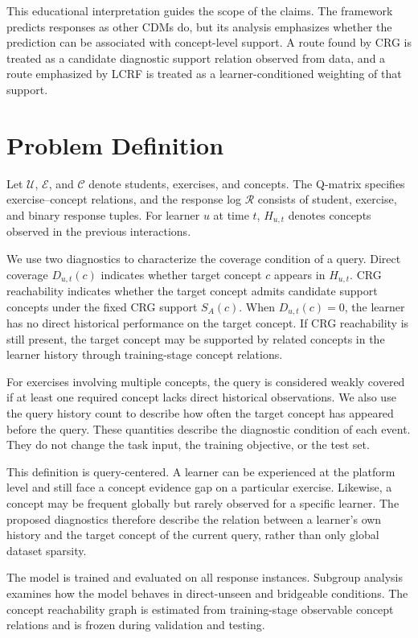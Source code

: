 \documentclass[conference]{IEEEtran}
\begin{document}
This educational interpretation guides the scope of the claims. The framework predicts responses as other CDMs do, but its analysis emphasizes whether the prediction can be associated with concept-level support. A route found by CRG is treated as a candidate diagnostic support relation observed from data, and a route emphasized by LCRF is treated as a learner-conditioned weighting of that support.

\section{Problem Definition}
Let \(\mathcal{U}\), \(\mathcal{E}\), and \(\mathcal{C}\) denote students, exercises, and concepts. The Q-matrix specifies exercise--concept relations, and the response log \(\mathcal{R}\) consists of student, exercise, and binary response tuples. For learner \(u\) at time \(t\), \(H_{u,t}\) denotes concepts observed in the previous interactions.

We use two diagnostics to characterize the coverage condition of a query. Direct coverage \(D_{u,t}(c)\) indicates whether target concept \(c\) appears in \(H_{u,t}\). CRG reachability indicates whether the target concept admits candidate support concepts under the fixed CRG support \(S_A(c)\). When \(D_{u,t}(c)=0\), the learner has no direct historical performance on the target concept. If CRG reachability is still present, the target concept may be supported by related concepts in the learner history through training-stage concept relations.

For exercises involving multiple concepts, the query is considered weakly covered if at least one required concept lacks direct historical observations. We also use the query history count to describe how often the target concept has appeared before the query. These quantities describe the diagnostic condition of each event. They do not change the task input, the training objective, or the test set.

This definition is query-centered. A learner can be experienced at the platform level and still face a concept evidence gap on a particular exercise. Likewise, a concept may be frequent globally but rarely observed for a specific learner. The proposed diagnostics therefore describe the relation between a learner's own history and the target concept of the current query, rather than only global dataset sparsity.

The model is trained and evaluated on all response instances. Subgroup analysis examines how the model behaves in direct-unseen and bridgeable conditions. The concept reachability graph is estimated from training-stage observable concept relations and is frozen during validation and testing.
\end{document}
